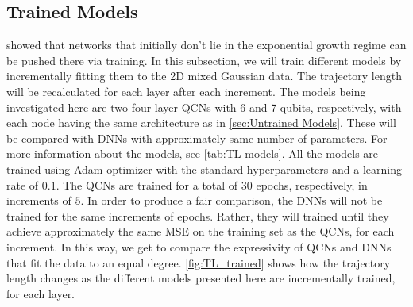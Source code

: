 \subsection{Trained Models}\label{sec:Trained Models}
\citet{raghu2017expressive} showed that networks that initially don't lie in the exponential growth regime can be pushed there via training. In this subsection, we will train different models by incrementally fitting them to the 2D mixed Gaussian data. The trajectory length will be recalculated for each layer after each increment. The models being investigated here are two four layer QCNs with 6 and 7 qubits, respectively, with each node having the same architecture as in \autoref{sec:Untrained Models}. These will be compared with DNNs with approximately same number of parameters. For more information about the models, see \autoref{tab:TL models}. All the models are trained using Adam optimizer with the standard hyperparameters and a learning rate of $0.1$. The QCNs are trained for a total of $30$ epochs, respectively, in increments of $5$. In order to produce a fair comparison, the DNNs will not be trained for the same increments of epochs. Rather, they will trained until they achieve approximately the same MSE on the training set as the QCNs, for each increment. In this way, we get to compare the expressivity of QCNs and DNNs that fit the data to an equal degree. \autoref{fig:TL_trained} shows how the trajectory length changes as the different models presented here are incrementally trained, for each layer. 

